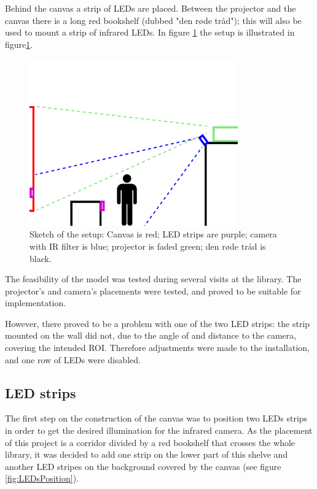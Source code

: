 Behind the canvas a strip of LEDs are placed. Between the projector and the canvas there is a long red bookshelf (dubbed "den r{\o}de tr{\aa}d"); this will also be used to mount a strip of infrared LEDs. In figure \ref{fig:setup_model} the setup is illustrated in figure\ref{fig:setup_model}.

\begin{figure}[htbp] 
\centering 
\includegraphics[width=0.8\textwidth]{Pictures/Setup/sideview_camera_with_person_two_strips.png} 
\caption{Sketch of the setup: Canvas is red; LED strips are purple; camera with IR filter is blue; projector is faded green; den r{\o}de tr{\aa}d is black.} 
\label{fig:setup_model} 
\end{figure}

The feasibility of the model was tested during several visits at the library. The projector's and camera's placements were tested, and proved to be suitable for implementation.

However, there proved to be a problem with one of the two LED strips: the strip mounted on the wall did not, due to the angle of and distance to the camera, covering the intended ROI. Therefore adjustments were made to the installation, and one row of LEDs were disabled.

\subsection{LED strips}
The first step on the construction of the canvas was to position two LEDs strips in order to get the desired illumination for the infrared camera. As the placement of this project is a corridor divided by a red bookshelf that crosses the whole library, it was decided to add one strip on the lower part of this shelve and another LED stripes on the background covered by the canvas (see figure \ref{fig:LEDsPosition}).

